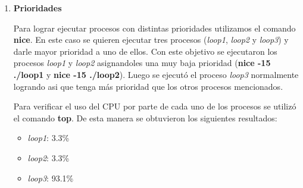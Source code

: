 \documentclass[a4paper,11pt] {article}
\begin{document}
\begin{enumerate}
  \item \textbf{Prioridades}

    Para lograr ejecutar procesos con distintas prioridades utilizamos el comando \textbf{nice}. En este caso se quieren ejecutar tres procesos (\textit{loop1}, \textit{loop2} y \textit{loop3}) y darle mayor prioridad a uno de ellos. Con este objetivo se ejecutaron los procesos \textit{loop1} y \textit{loop2} asignandoles una muy baja prioridad (\textbf{nice -15 ./loop1} y \textbf{nice -15 ./loop2}). Luego se ejecut\'o el proceso \textit{loop3} normalmente logrando asi que tenga m\'as prioridad que los otros procesos mencionados.

    Para verificar el uso del CPU por parte de cada uno de los procesos se utiliz\'o el comando \textbf{top}. De esta manera se obtuvieron los siguientes resultados:
    \begin{itemize}
      \item \textit{loop1}: 3.3\%
      \item \textit{loop2}: 3.3\%
      \item \textit{loop3}: 93.1\%
    \end{itemize}

\end{enumerate}
\end{document}
